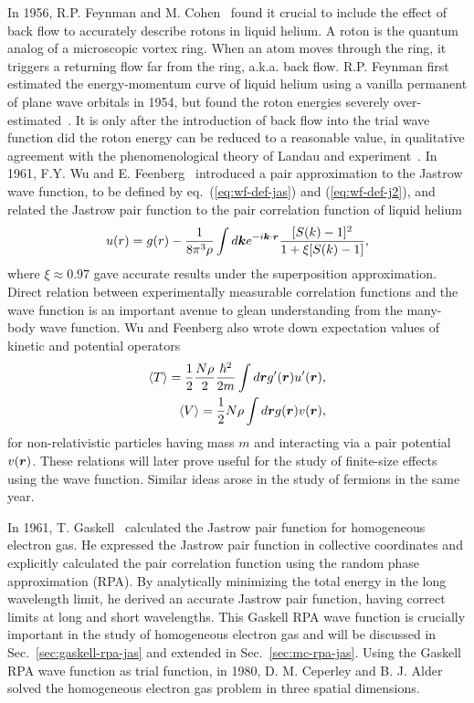 In 1956, R.P. Feynman and M. Cohen~\cite{Feynman1956} found it crucial to include the effect of back flow to accurately describe rotons in liquid helium. A roton is the quantum analog of a microscopic vortex ring. When an atom moves through the ring, it triggers a returning flow far from the ring, a.k.a. back flow. R.P. Feynman first estimated the energy-momentum curve of liquid helium using a vanilla permanent of plane wave orbitals in 1954, but found the roton energies severely over-estimated~\cite{Feynman1954}. It is only after the introduction of back flow into the trial wave function did the roton energy can be reduced to a reasonable value, in qualitative agreement with the phenomenological theory of Landau and experiment~\cite{Feynman1956}.
In 1961, F.Y. Wu and E. Feenberg~\cite{Wu1961} introduced a pair approximation to the Jastrow wave function, to be defined by eq.~(\ref{eq:wf-def-jas}) and (\ref{eq:wf-def-j2}), and related the Jastrow pair function to the pair correlation function of liquid helium
\begin{align}
u(r) = g(r) - \dfrac{1}{8\pi^3\rho}\int d\boldsymbol{k} e^{-i\boldsymbol{k}\cdot\boldsymbol{r}}
\dfrac{[S(k)-1]^2}{1+\xi[S(k)-1]},
\end{align}
where $\xi\approx0.97$ gave accurate results under the superposition approximation.
Direct relation between experimentally measurable correlation functions and the wave function is an important avenue to glean understanding from the many-body wave function. Wu and Feenberg also wrote down expectation values of kinetic and potential operators
\begin{align}
\braket{T} = \frac{1}{2}\dfrac{N\rho}{2}\dfrac{\hbar^2}{2m} \int d\boldsymbol{r} g'(\boldsymbol{r}) u'(\boldsymbol{r}), \\
\braket{V} = \frac{1}{2} N\rho\int d\boldsymbol{r} g(\boldsymbol{r}) v(\boldsymbol{r}),
\end{align}
for non-relativistic particles having mass $m$ and interacting via a pair potential $v(\boldsymbol{r})$. These relations will later prove useful for the study of finite-size effects using the wave function. Similar ideas arose in the study of fermions in the same year.

In 1961, T. Gaskell~\cite{Gaskell1961} calculated the Jastrow pair function for homogeneous electron gas. He expressed the Jastrow pair function in collective coordinates and explicitly calculated the pair correlation function using the random phase approximation (RPA). By analytically minimizing the total energy in the long wavelength limit, he derived an accurate Jastrow pair function, having correct limits at long and short wavelengths.
This Gaskell RPA wave function is crucially important in the study of homogeneous electron gas and will be discussed in Sec.~\ref{sec:gaskell-rpa-jas} and extended in Sec.~\ref{sec:mc-rpa-jas}.
Using the Gaskell RPA wave function as trial function, in 1980, D. M. Ceperley and B. J. Alder~\cite{Ceperley1980} solved the homogeneous electron gas problem in three spatial dimensions.

